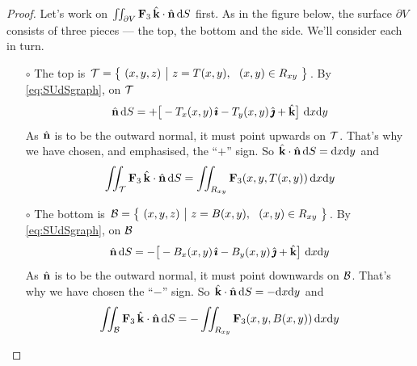 \begin{proof}
Let's work on $\iint_{\partial V}  \mathbf{F}_3\,\hat{\mathbf{k}} \cdot\hat{\mathbf{n}}\,\mathrm{d}S$
first.
As in the figure below, 
the surface $\partial V$ consists of three pieces --- the top, the bottom and 
the side. We'll consider each in turn.

\begin{itemize}\itemsep1pt \parskip0pt  %
\item[$\circ$]
The top is $\cT=\Set{(x,y,z)}{ z= T(x,y),\ \ (x,y)\in R_{xy}}$.
By \eqref{eq:SUdSgraph}, on $\mathcal{T}$
\begin{equation*}
\hn\, \dee{S}  = +\big[-T_x(x,y)\,\hi - T_y(x,y)\,\hj + \hk\big]\ 
          \dee{x}\dee{y}
\end{equation*}
As $\hat{\mathbf{n}}$ is to be the outward normal, it must point upwards on $\mathcal{T}$.
That's why we have chosen, and emphasised, the ``$+$'' sign. So $\hat{\mathbf{k}}\cdot\hat{\mathbf{n}}\,\mathrm{d}S = 
\mathrm{d}x\mathrm{d}y$ and
\begin{equation*}
\iint_{\mathcal{T}}  \mathbf{F}_3\,\hat{\mathbf{k}} \cdot\hat{\mathbf{n}}\,\mathrm{d}S
=\iint_{R_{xy}}  \mathbf{F}_3(x,y,T(x,y))\,\mathrm{d}x\mathrm{d}y
\end{equation*}

\item[$\circ$]
The bottom is 
$\cB=\Set{(x,y,z)}{ z= B(x,y),\ \ (x,y)\in R_{xy}}$.
By \eqref{eq:SUdSgraph}, on $\mathcal{B}$
\begin{equation*}
\hn\, \dee{S}  = -\big[-B_x(x,y)\,\hi - B_y(x,y)\,\hj + \hk\big]\ 
          \dee{x}\dee{y}
\end{equation*}
As $\hat{\mathbf{n}}$ is to be the outward normal, it must point downwards on $\mathcal{B}$.
That's why we have chosen the ``$-$'' sign. So $\hat{\mathbf{k}}\cdot\hat{\mathbf{n}}\,\mathrm{d}S = 
-\mathrm{d}x\mathrm{d}y$ and
\begin{equation*}
\iint_{\mathcal{B}}  \mathbf{F}_3\,\hat{\mathbf{k}} \cdot\hat{\mathbf{n}}\,\mathrm{d}S
=-\iint_{R_{xy}}  \mathbf{F}_3(x,y,B(x,y))\,\mathrm{d}x\mathrm{d}y
\end{equation*}


\end{itemize}
\end{proof}
